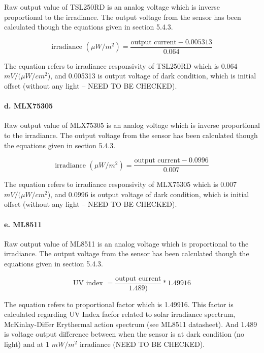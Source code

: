 Raw output value of TSL250RD is an analog voltage which is inverse proportional to the irradiance. The output voltage from the sensor has been calculated though the equations given in section 5.4.3.

{\centering
 \[ \text{irradiance } (\mu W/m^2) = \frac{\text{output current} - 0.005313}{0.064} \]
 \par
 }
 
 \bigbreak
 The equation refers to irradiance responsivity of TSL250RD which is 0.064 \(mV/(\mu W/cm^2\)), and 0.005313 is output voltage of dark condition, which is initial offset (without any light -- NEED TO BE CHECKED).

\paragraph{d. MLX75305}

Raw output value of MLX75305 is an analog voltage which is inverse proportional to the irradiance. The output voltage from the sensor has been calculated though the equations given in section 5.4.3.

{\centering
 \[ \text{irradiance } (\mu W/m^2) = \frac{\text{output current} - 0.0996}{0.007} \]
 \par
 }
 
 \bigbreak
 The equation refers to irradiance responsivity of MLX75305 which is 0.007 \(mV/(\mu W/cm^2\)), and 0.0996 is output voltage of dark condition, which is initial offset (without any light -- NEED TO BE CHECKED).

\paragraph{e. ML8511}

Raw output value of ML8511 is an analog voltage which is proportional to the irradiance. The output voltage from the sensor has been calculated though the equations given in section 5.4.3.

{\centering
 \[ \text{UV index } = \frac{\text{output current}}{1.489)} * 1.49916 \]
 \par
 }
 
 \bigbreak
 The equation refers to proportional factor which is 1.49916. This factor is calculated regarding UV Index facfor related to solar irradiance spectrum, McKinlay-Differ Erythermal action spectrum (see ML8511 datasheet). And 1.489 is voltage output difference between when the sensor is at dark condition (no light) and at 1 \(mW/m^2\) irradiance (NEED TO BE CHECKED).

